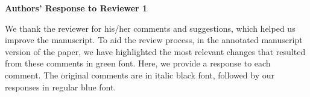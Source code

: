 \documentclass{article}
\begin{document}
%



\newpage
\begin{center}
	\bf
	\large
	Authors' Response to Reviewer 1
\end{center}

\noindent
We thank the reviewer for his/her comments and suggestions, which helped us improve the manuscript. To aid the review process, in the annotated manuscript version of the paper, we have highlighted the most relevant changes that resulted from these comments in green font. Here, we provide a response to each comment. The original comments are in italic black font, followed by our responses in regular blue font.
\vspace{2ex}
\newline
\end{document}
